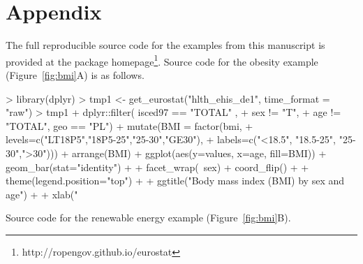 \address{Przemys{\l}aw Biecek\\
  Faculty of Mathematics, Informatics, and Mechanics\\
  University of Warsaw\\
  Banacha 2, 02-097 Warsaw\\
  Poland\\}

\newpage

\section{Appendix}

The full reproducible source code for the examples from this manuscript is provided at the package homepage\footnote{http://ropengov.github.io/eurostat}. Source code for the obesity example (Figure~\ref{fig:bmi}A) is as follows.

\begin{example}
> library(dplyr)
> tmp1 <- get_eurostat("hlth_ehis_de1", time_format = "raw")
> tmp1 %
+  dplyr::filter( isced97 == "TOTAL" ,
+          sex != "T",
+          age != "TOTAL", geo == "PL") %
+  mutate(BMI = factor(bmi, 
+                      levels=c("LT18P5","18P5-25","25-30","GE30"), 
+                      labels=c("<18.5", "18.5-25", "25-30",">30"))) %
+  arrange(BMI) %
+  ggplot(aes(y=values, x=age, fill=BMI)) + geom_bar(stat="identity") +
+  facet_wrap(~sex) + coord_flip() +
+  theme(legend.position="top") +
+  ggtitle("Body mass index (BMI) by sex and age") +
+  xlab("%
\end{example}


Source code for the renewable energy example (Figure~\ref{fig:bmi}B).

